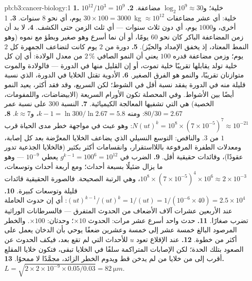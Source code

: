 \begin{solution}{pb:b3:cancer-biology:1}
\textbf{1.} $10^{12}/10^{3} = 10^{9}$ خلية؛ و$\log_{2}10^{9} \approx 30$
مضاعفة.
\textbf{2.} $30\times 100 = 3000$ يوم، أي نحو $8$ سنوات.
\textbf{3.} \qty{1}{kg} $\approx 10^{12}$ خلية: أي عشر مضاعفات أخرى،
و$1000$ يوم، أي دون ثلاث سنوات --- أي ثلث الزمن حتى الكشف.
\textbf{4.} لا بد أن زمن المضاعفة الباكر كان نحو $60$ يومًا، أو
أن  نما أسرع وهو صغير وبطؤ مع نموه (وهو النمط المعتاد،
إذ يخفق الإمداد والحيّز).
\textbf{5.} دورة من $2$ يوم كانت لتضاعف الجمهرة كل $2$
يوم؛ وزمن مضاعفة قدره $100$ يعني أن النمو الصافي $2\,\%$ من
معدل الولادة: أي إن كل خلية تولد يقابلها تقريبًا خلية تموت، أو إن القليل
منها في الدورة --- فالولادة والموت متوازنان تقريبًا، والنمو هو الفرق
الصغير.
\textbf{6.} الأدوية تقتل الخلايا في الدورة،  الذي نسبة قليلة
منه في الدورة يفقد نسبة أقل في الشوط؛ لكن  السريع، وقد
فقد أكثر، يعيد النمو أيضًا بين الأشواط. وفي المحصلة تكون الأورام
السريعة (الابيضاضات، واللمفومات،  الخصية) هي التي تشفيها
المعالجة الكيميائية.
\textbf{7.} النسبة $300$ على نسبة عمر $80/30 = 2.67$: ومنه $k - 1 =
\ln 300/\ln 2.67 = 5.8$، و$k \approx 7$.
\textbf{8.} $N(ut)^{k} = 10^{8}\times (7\times 10^{-5})^{7} \approx
10^{-21}$: وهو عبث في مواجهة خطر مدى الحياة قرب $1$ من $3$. والناقص:
التوسع النسيلي الذي يضاعف الخلايا المعرَّضة بعد كل إصابة، ومعدلات
الطفرة المرفوعة باللااستقرار، وانقسامات أكثر بكثير (فالخلايا الجذعية تدور
عقودًا)، وقائدات حقيقية أقل.
\textbf{9.} الضرب في $g^{k-1} = 100^{6} = 10^{12}$ يعطي $10^{-9}$
--- وهو ما يزال ضئيلًا بسبعة أحداث؛ ومع أربعة أحداث وتوسعات،
$10^{8}\times (7\times 10^{-5})^{4}\times 10^{6} \approx 2\times
10^{-3}$، وهي الرتبة الصحيحة. فالصورة الحقيقية قائدات قليلة وتوسعات
كبيرة.
\textbf{10.} $(ut)^{k-1}/(ut)^{k} = 1/(ut) = 1/(10^{-6}\times 40) =
2.5\times 10^{4}$: أي إن حدوث الحاملة عند الأربعين عشرات آلاف
الأضعاف من الحدوث المتفرق --- فالسرطانات الوراثية تضرب صغارًا.
\textbf{11.} حدث واحد أسرع عشر مرات: الحدوث $\times 10$؛ وحدثان:
$\times 100$. والخطر المرصود البالغ خمسة عشر إلى خمسة وعشرين ضعفًا يوحي
بأن الدخان يعمل على أكثر من خطوة.
\textbf{12.} عند الإقلاع تعود $u$ للأحداث التي لم تقع بعد،
فيكف الحدوث عن الصعود بتلك الحدة؛ لكن الإصابات
المتراكمة سلفًا في الخلايا تبقى، فتكون خلايا المقلع أقرب إلى
 من خلايا من لم يدخن قط ويدوم الخطر الزائد، مجمَّدًا
لا ممحوًا.
\textbf{13.} $L = \sqrt{2\times 2\times 10^{-9}\times 0.05/0.03} =
\qty{82}{\micro m}$.

\end{solution}
